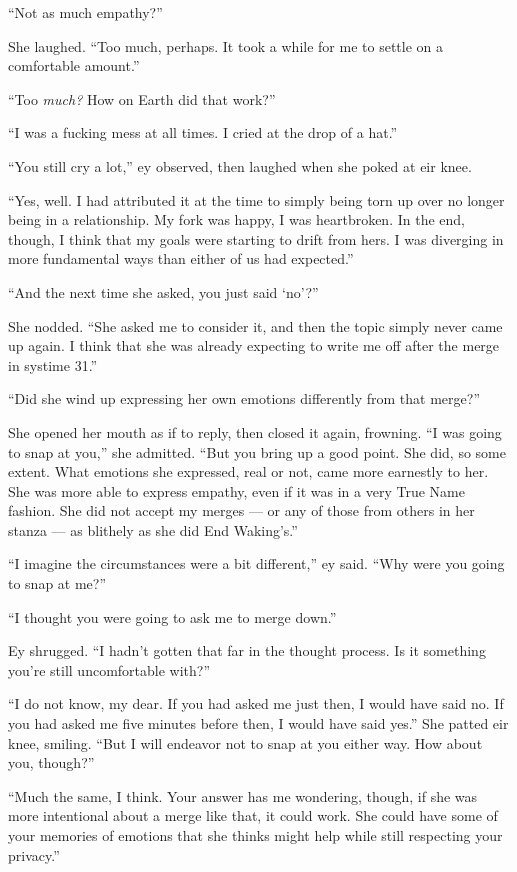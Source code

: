 ``Not as much empathy?''

She laughed. ``Too much, perhaps. It took a while for me to settle on a comfortable amount.''

``Too \emph{much?} How on Earth did that work?''

``I was a fucking mess at all times. I cried at the drop of a hat.''

``You still cry a lot,'' ey observed, then laughed when she poked at eir knee.

``Yes, well. I had attributed it at the time to simply being torn up over no longer being in a relationship. My fork was happy, I was heartbroken. In the end, though, I think that my goals were starting to drift from hers. I was diverging in more fundamental ways than either of us had expected.''

``And the next time she asked, you just said `no'?''

She nodded. ``She asked me to consider it, and then the topic simply never came up again. I think that she was already expecting to write me off after the merge in systime 31.''

``Did she wind up expressing her own emotions differently from that merge?''

She opened her mouth as if to reply, then closed it again, frowning. ``I was going to snap at you,'' she admitted. ``But you bring up a good point. She did, so some extent. What emotions she expressed, real or not, came more earnestly to her. She was more able to express empathy, even if it was in a very True Name fashion. She did not accept my merges — or any of those from others in her stanza — as blithely as she did End Waking's.''

``I imagine the circumstances were a bit different,'' ey said. ``Why were you going to snap at me?''

``I thought you were going to ask me to merge down.''

Ey shrugged. ``I hadn't gotten that far in the thought process. Is it something you're still uncomfortable with?''

``I do not know, my dear. If you had asked me just then, I would have said no. If you had asked me five minutes before then, I would have said yes.'' She patted eir knee, smiling. ``But I will endeavor not to snap at you either way. How about you, though?''

``Much the same, I think. Your answer has me wondering, though, if she was more intentional about a merge like that, it could work. She could have some of your memories of emotions that she thinks might help while still respecting your privacy.''

